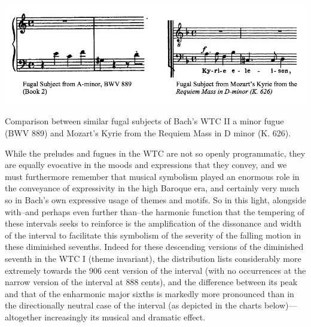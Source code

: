 \begin{Example}[H]
\centering
\includegraphics{kyrie_text.png}
\caption{Comparison between similar fugal subjects of Bach's WTC II a minor fugue (BWV 889) and Mozart's Kyrie from the Requiem Mass in D minor (K. 626).}
\end{Example}
    While the preludes and fugues in the WTC are not so openly programmatic,
they are equally evocative in the moods and expressions that they
convey, and we must furthermore remember that musical symbolism played
an enormous role in the conveyance of expressivity in the high Baroque
era, and certainly very much so in Bach's own expressive usage of themes
and motifs. So in this light, alongside with--and perhaps even further
than--the harmonic function that the tempering of these intervals
seeks to reinforce is the amplification of the dissonance and width of
the interval to facilitate this symbolism of the severity of the falling
motion in these diminished sevenths. Indeed for these descending
versions of the diminished seventh in the WTC I (theme invariant), the
distribution lists considerably more extremely towards the 906 cent
version of the interval (with no occurrences at the narrow version of
the interval at 888 cents), and the difference between its peak and that
of the enharmonic major sixths is markedly more pronounced than in the
directionally neutral case of the interval (as depicted in the charts
below)---altogether increasingly its musical and dramatic effect.


    \begin{center}
    \end{center}
    

    \begin{center}
    \end{center}
    

